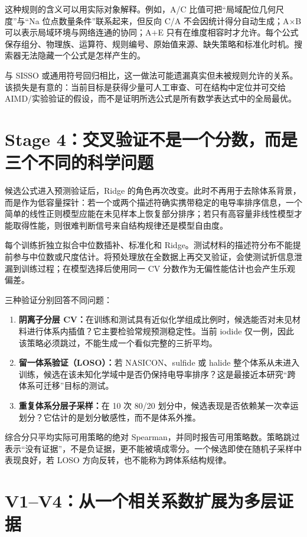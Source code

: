 这种规则的含义可以用实际对象解释。例如，A/C 比值可把“局域配位几何尺度”与“Na 位点数量条件”联系起来，但反向 C/A 不会因统计得分自动生成；A$\times$B 可以表示局域环境与网络连通的协同；A$+$E 只有在维度相容时才允许。每个公式保存组分、物理族、运算符、规则编号、原始值来源、缺失策略和标准化时机。搜索器无法隐藏一个公式是怎样产生的。

与 SISSO 或通用符号回归相比，这一做法可能遗漏真实但未被规则允许的关系。该损失是有意的：当前目标是获得少量可人工审查、可在结构中定位并可交给 AIMD/实验验证的假设，而不是证明所选公式是所有数学表达式中的全局最优。

\section{Stage 4：交叉验证不是一个分数，而是三个不同的科学问题}

候选公式进入预测验证后，Ridge 的角色再次改变。此时不再用于去除体系背景，而是作为低容量探针：若一个或两个描述符确实携带稳定的电导率排序信息，一个简单的线性正则模型应能在未见样本上恢复部分排序；若只有高容量非线性模型才能取得性能，则很难判断信号来自结构规律还是模型自由度。

每个训练折独立拟合中位数插补、标准化和 Ridge。测试材料的描述符分布不能提前参与中位数或尺度估计。将预处理放在全数据上再交叉验证，会使测试折信息泄漏到训练过程；在模型选择后使用同一 CV 分数作为无偏性能估计也会产生乐观偏差\cite{VarmaSimon2006}。

三种验证分别回答不同问题：

\begin{enumerate}
  \item \textbf{阴离子分层 CV：}在训练和测试具有近似化学组成比例时，候选能否对未见材料进行体系内插值？它主要检验常规预测稳定性。当前 iodide 仅一例，因此该策略必须跳过，不能生成一个看似完整的三折平均。
  \item \textbf{留一体系验证（LOSO）：}若 NASICON、sulfide 或 halide 整个体系从未进入训练，候选在该未知化学域中是否仍保持电导率排序？这是最接近本研究“跨体系可迁移”目标的测试。
  \item \textbf{重复体系分层子采样：}在 10 次 80/20 划分中，候选表现是否依赖某一次幸运划分？它估计的是划分敏感性，而不是体系外推。
\end{enumerate}

综合分只平均实际可用策略的绝对 Spearman，并同时报告可用策略数。策略跳过表示“没有证据”，不是负证据，更不能被填成零分。一个候选即使在随机子采样中表现良好，若 LOSO 方向反转，也不能称为跨体系结构规律。

\section{V1--V4：从一个相关系数扩展为多层证据}

